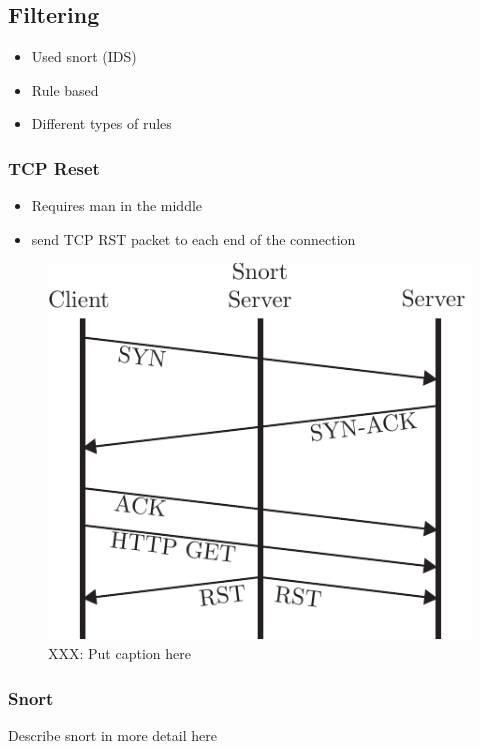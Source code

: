 \subsection{Filtering}

\begin{itemize}
    \item Used snort (IDS)
    \item Rule based
    \item Different types of rules
\end{itemize}

\subsubsection{TCP Reset}

\begin{itemize}
    \item Requires man in the middle
    \item send TCP RST packet to each end of the connection
\end{itemize}

\begin{figure}[!t]
    \centering
    \includegraphics[width=.8\columnwidth]{figures/tcp_reset}
    \caption{XXX: Put caption here}
    \label{fig:tcp_reset}
\end{figure}

\subsubsection{Snort}

Describe snort in more detail here

